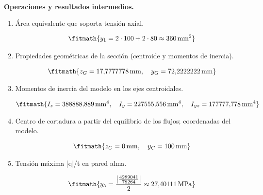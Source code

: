 \noindent\textbf{Operaciones y resultados intermedios.}

\begin{enumerate}

\item Área equivalente que soporta tensión axial.

\[\fitmath{y_{1}=2\cdot 100+2\cdot 80\approx 360\,\mathrm{mm^{2}}}\]

\item Propiedades geométricas de la sección (centroide y momentos de inercia).

\[\fitmath{z_G=17{,}7777778\,\mathrm{mm},\quad y_G=72{,}2222222\,\mathrm{mm}}\]

\item Momentos de inercia del modelo en los ejes centroidales.

\[\fitmath{I_z=388888{,}889\,\mathrm{mm}^{4},\quad I_y=227555{,}556\,\mathrm{mm}^{4},\quad I_{yz}=177777{,}778\,\mathrm{mm}^{4}}\]

\item Centro de cortadura a partir del equilibrio de los flujos; coordenadas del modelo.

\[\fitmath{z_C=0\,\mathrm{mm},\quad y_C=100\,\mathrm{mm}}\]

\item Tensión máxima |q|/t en pared alma.

\[\fitmath{y_{5}=\frac{\left|\frac{4289041}{78264}\right|}{2}\approx 27{,}40111\,\mathrm{MPa}}\]

\end{enumerate}
